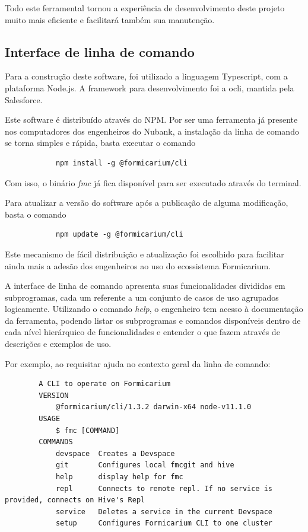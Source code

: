             Todo este ferramental tornou a experiência de desenvolvimento deste projeto muito mais eficiente e facilitará também sua manutenção.
    
        \subsection{Interface de linha de comando}
            
            Para a construção deste software, foi utilizado a linguagem Typescript, com a plataforma Node.js. A framework para desenvolvimento foi a ocli, mantida pela Salesforce.
            
            Este software é distribuído através do NPM. Por ser uma ferramenta já presente nos computadores dos engenheiros do Nubank, a instalação da linha de comando se torna simples e rápida, basta executar o comando
        \begin{verbatim}
    	    npm install -g @formicarium/cli
    	\end{verbatim}
    	
    	Com isso, o binário \textit{fmc} já fica disponível para ser executado através do terminal.
    	
    	Para atualizar a versão do software após a publicação de alguma modificação, basta o comando
    	\begin{verbatim}
    	    npm update -g @formicarium/cli
    	\end{verbatim}
    	
    	Este mecanismo de fácil distribuição e atualização foi escolhido para facilitar ainda mais a adesão dos engenheiros ao uso do ecossistema Formicarium.
    
        A interface de linha de comando apresenta suas funcionalidades divididas em subprogramas, cada um referente a um conjunto de casos de uso agrupados logicamente. Utilizando o comando \textit{help}, o engenheiro tem acesso à documentação da ferramenta, podendo listar os subprogramas e comandos disponíveis dentro de cada nível hierárquico de funcionalidades e entender o que fazem através de descrições e exemplos de uso.
    
        Por exemplo, ao requisitar ajuda no contexto geral da linha de comando:
    
        \begin{verbatim}
        A CLI to operate on Formicarium
        VERSION
            @formicarium/cli/1.3.2 darwin-x64 node-v11.1.0
        USAGE
            $ fmc [COMMAND]
        COMMANDS
            devspace  Creates a Devspace
            git       Configures local fmcgit and hive
            help      display help for fmc
            repl      Connects to remote repl. If no service is provided, connects on Hive's Repl
            service   Deletes a service in the current Devspace
            setup     Configures Formicarium CLI to one cluster
        \end{verbatim}
        
